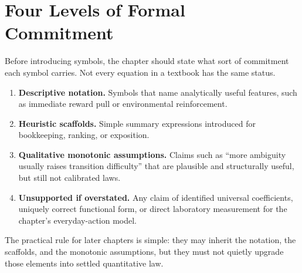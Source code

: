 \section{Four Levels of Formal Commitment}

Before introducing symbols, the chapter should state what sort of commitment
each symbol carries. Not every equation in a textbook has the same status.

\begin{enumerate}[nosep]
  \item \textbf{Descriptive notation.} Symbols that name analytically useful
        features, such as immediate reward pull or environmental reinforcement.
  \item \textbf{Heuristic scaffolds.} Simple summary expressions introduced for
        bookkeeping, ranking, or exposition.
  \item \textbf{Qualitative monotonic assumptions.} Claims such as ``more
        ambiguity usually raises transition difficulty'' that are plausible and
        structurally useful, but still not calibrated laws.
  \item \textbf{Unsupported if overstated.} Any claim of identified universal
        coefficients, uniquely correct functional form, or direct laboratory
        measurement for the chapter's everyday-action model.
\end{enumerate}

\begin{remark}
The practical rule for later chapters is simple: they may inherit the
notation, the scaffolds, and the monotonic assumptions, but they must not
quietly upgrade those elements into settled quantitative law.
\end{remark}
